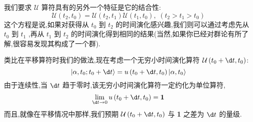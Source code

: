\documentclass[lang=cn,newtx,10pt,scheme=chinese,thmcnt=section]{elegantbook}
\begin{document}
我们要求 $\mathcal{U}$ 算符具有的另外一个特征是它的结合性:
\begin{equation}
	\mathcal{U}\left( {{t}_{2},{t}_{0}}\right) = \mathcal{U}\left( {{t}_{2},{t}_{1}}\right) \mathcal{U}\left( {{t}_{1},{t}_{0}}\right) ,\;\left( {{t}_{2} > {t}_{1} > {t}_{0}}\right)
\end{equation}
这个方程是说,如果对获得从 ${t}_{0}$ 到 ${t}_{2}$ 的时间演化感兴趣,我们则可以通过考虑先从 ${t}_{0}$ 到 ${t}_{1}$ ,再从 ${t}_{1}$ 到 ${t}_{2}$ 的时间演化得到相同的结果(当然,如果你已经对群论有所了解,很容易发现其构成了一个群). 

类比在平移算符时我们的做法,现在考虑一个无穷小时间演化算符 $\mathcal{U}\left( {{t}_{0} + {\d t},{t}_{0}}\right)$:
\begin{equation}
	\left| {\alpha ,{t}_{0};{t}_{0} + {\d t}}\right\rangle = u\left( {{t}_{0} + {\d t},{t}_{0}}\right) \left| {\alpha ,{t}_{0}}\right\rangle
\end{equation}
由于连续性,当 ${\d t}$ 趋于零时,该无穷小时间演化算符一定约化为单位算符,
\begin{equation}
	\mathop{\lim }\limits_{{{\d t} \rightarrow 0}}u\left( {{t}_{0} + {\d t},{t}_{0}}\right) = \textbf{1}
\end{equation}
而且,就像在平移情况中那样,我们预期 $\mathcal{U}\left( {{t}_{0} + {\d t},{t}_{0}}\right)$ 与 \textbf{1} 之差为 ${\d t}$ 的量级.
\end{document}
